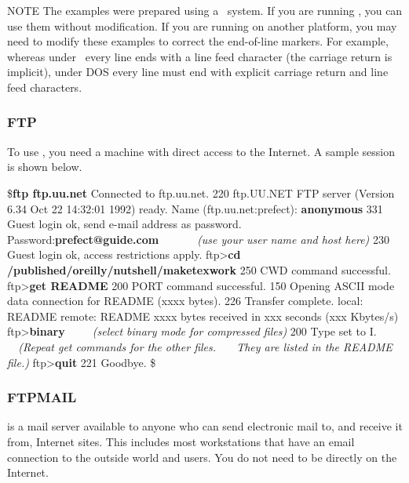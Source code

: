 \begin{note}{NOTE}
The examples were prepared using a \Unix\ system. If you are running
\Unix, you can use them without modification. If you are running on another
platform, you may need to modify these examples to correct the end-of-line
markers. For example, whereas under \Unix\ every line ends with a line feed
character (the carriage return is implicit), under DOS every line must end
with explicit carriage return and line feed characters.
\end{note}

\subsubsection{FTP}

To use , you need a machine with direct access
to the Internet. A sample session is shown below.

\begin{ttindent}
\${\bf ftp ftp.uu.net} Connected to ftp.uu.net.  
220 ftp.UU.NET FTP server (Version 6.34 Oct 22 14:32:01 1992) ready.  
Name (ftp.uu.net:prefect): {\bf anonymous} 
331 Guest login ok, send e-mail address as password.  
Password:{\bf prefect@guide.com}\ \ \ \ \ \ \ {\rm\it\small (use your user name and host here)} 
230 Guest login ok, access restrictions apply.  
ftp>{\bf cd /published/oreilly/nutshell/maketexwork} 
250 CWD command successful.  
ftp>{\bf get README} 
200 PORT command successful.  
150 Opening ASCII mode data connection for README (xxxx bytes).  
226 Transfer complete.  
local: README remote: README 
xxxx bytes received in xxx seconds (xxx Kbytes/s) 
ftp>{\bf binary}\ \ \ \ \ {\rm\it\small (select binary mode for compressed files)} 
200 Type set to I.
{\rm\it\small \ \ (Repeat get commands for the other files.}  
{\rm\it\small \ \ \ They are listed in the README file.)}  
ftp>{\bf quit} 221 Goodbye.  
\$
\end{ttindent}
\vspace{6pt}

\subsubsection{FTPMAIL}

 is a mail server available to anyone
who can send electronic mail to, and receive it from, Internet sites. This
includes most workstations that have an email connection to the outside world
and  users.  You do not need to
be directly on the Internet.

